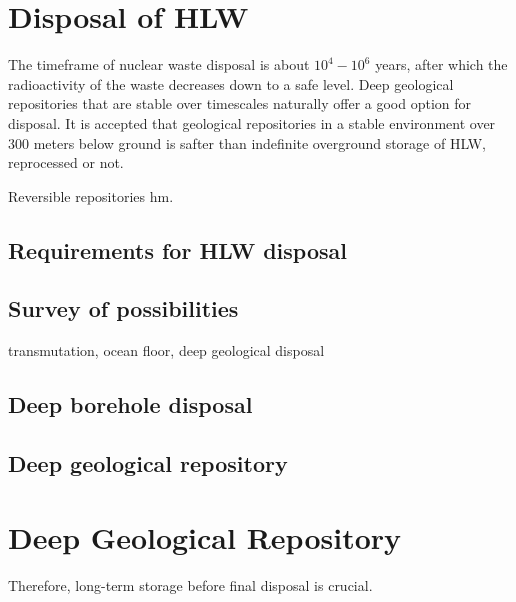 \documentclass[preprint,aip,pra]{revtex4-1}
\begin{document}
\section{Disposal of HLW}
    The timeframe of nuclear waste disposal is about $10^4-10^6$ years, after which the radioactivity
    of the waste decreases down to a safe level.
    Deep geological repositories that are stable over timescales naturally offer a good option for disposal.
    It is accepted that geological repositories in a stable environment over 300 meters below ground
    is safter than indefinite overground storage of HLW, reprocessed or not.\cite{fmr11}
    
    Reversible repositories hm.
    \subsection{Requirements for HLW disposal}
     \subsection{Survey of possibilities}
     transmutation, ocean floor, deep geological disposal
     \subsection{Deep borehole disposal}
     \subsection{Deep geological repository}
%
\section{Deep Geological Repository}
    Therefore, long-term storage before final disposal is crucial. 
\end{document}
